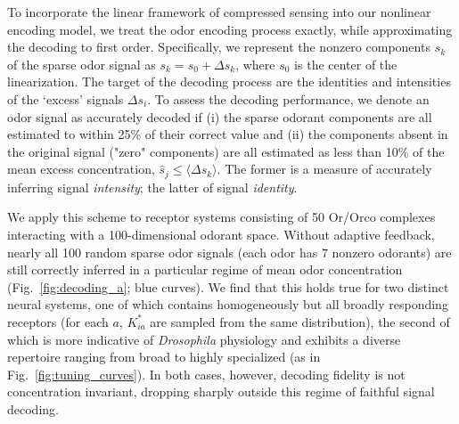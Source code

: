 \begin{figure}
	\label{fig:decoding}
\end{figure}

To incorporate the linear framework of compressed sensing into our nonlinear encoding model, we treat the odor encoding process exactly, while approximating the decoding to first order. %
Specifically, we represent the nonzero components $s_k$ of the sparse odor signal as $s_k = s_0 + \Delta s_k$, where $s_0$ is the center of the linearization. The target of the decoding process are the identities and intensities of the `excess' signals $\Delta s_i$. 
To assess the decoding performance, we denote an odor signal as accurately decoded if (i) the sparse odorant components are all estimated to within 25\% of their correct value and (ii) the components absent in the original signal ("zero" components) are all estimated as less than 10\% of the mean excess concentration, $\hat s_j \le \langle \Delta s_k \rangle$. The former is a measure of accurately inferring signal \textit{intensity}; the latter of signal \textit{identity}. 

We apply this scheme to receptor systems consisting of 50 Or/Orco complexes interacting with a 100-dimensional odorant space. Without adaptive feedback, nearly all 100 random sparse odor signals (each odor has $7$ nonzero odorants) are still correctly inferred in a particular regime of mean odor concentration (Fig.~\ref{fig:decoding_a}; blue curves). We find that this holds true for two distinct neural systems, one of which contains homogeneously but all broadly responding receptors (for each $a$, $K^*_{ia}$ are sampled from the same distribution), the second of which is more indicative of \textit{Drosophila} physiology and exhibits a diverse repertoire ranging from broad to highly specialized (as in Fig.~\ref{fig:tuning_curves}). In both cases, however, decoding fidelity is not concentration invariant, dropping sharply outside this regime of faithful signal decoding.

